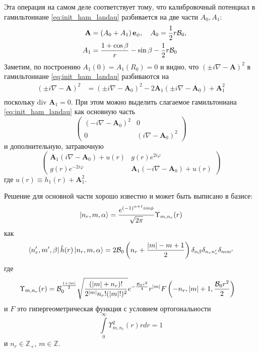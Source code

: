 \documentclass[a4paper,article,14pt]{extarticle}
\begin{document}
Эта операция на самом деле соответствует тому, что калибровочный потенциал в гамильтониане \eqref{eq:init_ham_landau} разбивается на две части $A_0,A_1$:
\begin{equation}
\begin{aligned}
\mathbf{A}  & = \left(A_0 + A_1  \right) \mathbf{e}_\phi, \quad A_0 =   \frac 1 2 r {\cal B}_{0} ,    \\
\quad A_1 & = \frac{1+  \cos\beta } { r } - \sin \beta - \frac 1 2 r {\cal B}_{0}     \\
\end{aligned}
\label{eq:devide_2_hamilte}
\end{equation}
Заметим, по построению $A_{1}(0) = A_{1}(R_{0}) = 0 $ и  видно, что $(\pm i \nabla - \mathbf{A} ) ^ 2$  в гамильтониане \eqref{eq:init_ham_landau} разбиваются на
\begin{equation}
\begin{aligned}
(\pm i \nabla - \mathbf{A} ) ^ 2 & = (\pm i \nabla - \mathbf{A}_0 ) ^ 2 - 
2 \mathbf{A}_1  (\pm i \nabla - \mathbf{A}_0 )+ \mathbf{A}_1^2   \\
\end{aligned}
\end{equation}
поскольку $ \mbox{div } \mathbf{A}_1=0$. 
При этом  можно выделить слагаемое гамильтониана \eqref{eq:init_ham_landau} как основную часть
$$
\begin{pmatrix} ( -i \nabla - \mathbf{A}_0 ) ^ 2 & 0 \\ 0 & ( i \nabla - \mathbf{A}_0 ) ^ 2 \end{pmatrix}
$$
и дополнительную, затравочную
$$
\begin{pmatrix} \mathbf{A}_1  (i \nabla - \mathbf{A}_0 ) + u(r) & g (r) e^{2 i  \varphi} \\ g (r) e^{-2 i  \varphi} & \mathbf{A}_1  (-i \nabla - \mathbf{A}_0 ) + u(r) \end{pmatrix}
$$ 
где $u(r) \equiv  h_1(r) + \mathbf{A}_1^2$. 

Решение для основной части хорошо известно и может быть выписано в базисе:
\begin{equation}
\label{eq:basis_func_landau}
\ket{n_r, m, \alpha} = \frac{e^{(-1)^{\alpha+1}  i m \phi}} {\sqrt{2 \pi}} \Upsilon_{m,n_r} (r)
\end{equation}
как
$$
\bra{n_r', m', \beta} \hat h (r)  \ket{n_r, m, \alpha} = 2 {\cal B}_{0} \left( n_r + \frac{|m| - m + 1}{2} \right) \delta_{\alpha \beta} \delta_{n_r n'_r} \delta_{m m'} 
$$
\noindent где  
\begin{equation}
\begin{aligned}
\Upsilon_{m, n_r} (r) & = {\cal B}_{0}^{\frac{1+|m|}{2}} \sqrt{\frac{(|m| + n_r)!}{2^{|m|}n_r!(|m|!)^2}} e^{-\frac{{\cal B}_{0} r^2}{4}} r^{|m|} F\left(-n_r,|m| + 1,\frac{{\cal B}_{0} r^2 }{2} \right) 
\end{aligned}
\end{equation}
\noindent и $F$  это гипергеометрическая функция с условием ортогональности 
$$ \int\limits_0^\infty \Upsilon_{m, n_r}^2 (r) r dr = 1$$
и $n_r \in \mathbb{Z}_+$, $m \in \mathbb{Z}$.
\end{document}
